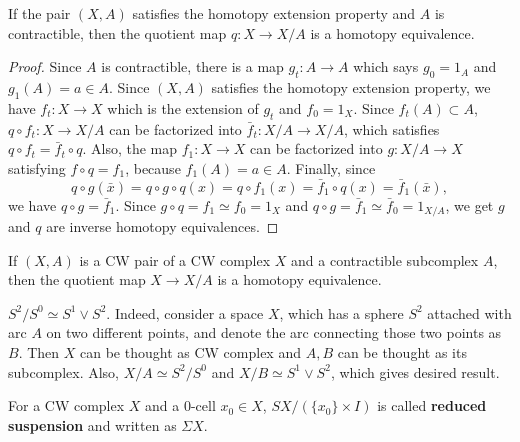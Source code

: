 \begin{prop} If the pair $(X,A)$ satisfies the homotopy extension property and $A$ is contractible, then the quotient map $q:X\rightarrow X/A$ is a homotopy equivalence.
\end{prop}
\begin{proof} Since $A$ is contractible, there is a map $g_t:A\rightarrow A$ which says $g_0=1_{A}$ and $g_1(A)=a\in A$. Since $(X,A)$ satisfies the homotopy extension property, we have $f_t:X\rightarrow X$ which is the extension of $g_t$ and $f_0=1_X$. Since $f_t(A)\subset A$, $q\circ f_t:X\rightarrow X/A$ can be factorized into $\bar{f}_t:X/A\rightarrow X/A$, which satisfies $q\circ f_t=\bar{f}_t\circ q$. Also, the map $f_1:X\rightarrow X$ can be factorized into $g:X/A\rightarrow X$ satisfying $f\circ q=f_1$, because $f_1(A)=a\in A$. Finally, since
\begin{equation}
q\circ g(\bar{x})=q\circ g\circ q(x)=q\circ f_1(x)=\bar{f}_1\circ q(x)=\bar{f}_1(\bar{x}),
\end{equation}
we have $q\circ g=\bar{f}_1$. Since $g\circ q=f_1\simeq f_0=1_X$ and $q\circ g=\bar{f}_1\simeq \bar{f}_0=1_{X/A}$, we get $g$ and $q$ are inverse homotopy equivalences.
\end{proof}

\begin{cor} If $(X,A)$ is a CW pair of a CW complex $X$ and a contractible subcomplex $A$, then the quotient map $X\rightarrow X/A$ is a homotopy equivalence.
\end{cor}

\begin{exmp} $S^2/S^0\simeq S^1\vee S^2$. Indeed, consider a space $X$, which has a sphere $S^2$ attached with arc $A$ on two different points, and denote the arc connecting those two points as $B$. Then $X$ can be thought as CW complex and $A,B$ can be thought as its subcomplex. Also, $X/A\simeq S^2/S^0$ and $X/B\simeq S^1\vee S^2$, which gives desired result.
\end{exmp}

\begin{defn} For a CW complex $X$ and a 0-cell $x_0\in X$, $SX/(\{x_0\}\times I)$ is called \textbf{reduced suspension} and written as $\Sigma X$.
\end{defn}

